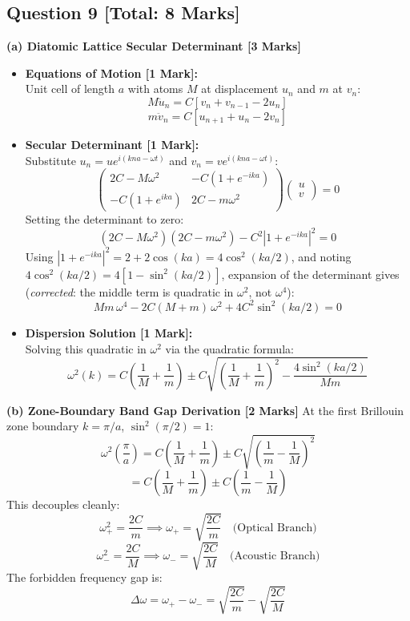 \documentclass[10pt,a4paper,twocolumn]{article}
\begin{document}
\subsection*{Question 9 [Total: 8 Marks]}
\textbf{(a) Diatomic Lattice Secular Determinant [3 Marks]}
\begin{itemize}
    \item \textbf{Equations of Motion [1 Mark]:}\\
    Unit cell of length $a$ with atoms $M$ at displacement $u_n$ and $m$ at $v_n$:
    $$M \ddot{u}_n = C [v_n + v_{n-1} - 2u_n]$$
    $$m \ddot{v}_n = C [u_{n+1} + u_n - 2v_n]$$
    \item \textbf{Secular Determinant [1 Mark]:}\\
    Substitute $u_n = u e^{i(kna - \omega t)}$ and $v_n = v e^{i(kna - \omega t)}$:
    $$\begin{pmatrix} 2C - M\omega^2 & -C(1 + e^{-ika}) \\ -C(1 + e^{ika}) & 2C - m\omega^2 \end{pmatrix} \begin{pmatrix} u \\ v \end{pmatrix} = 0$$
    Setting the determinant to zero:
    $$(2C - M\omega^2)(2C - m\omega^2) - C^2|1 + e^{-ika}|^2 = 0$$
    Using $|1 + e^{-ika}|^2 = 2 + 2\cos(ka) = 4\cos^2(ka/2)$, and noting $4\cos^2(ka/2) = 4[1-\sin^2(ka/2)]$, expansion of the determinant gives (\emph{corrected}: the middle term is quadratic in $\omega^2$, not $\omega^4$):
    $$Mm\,\omega^4 - 2C(M+m)\,\omega^2 + 4C^2\sin^2(ka/2) = 0$$
    \item \textbf{Dispersion Solution [1 Mark]:}\\
    Solving this quadratic in $\omega^2$ via the quadratic formula:
    $$\omega^2(k) = C\left(\frac{1}{M} + \frac{1}{m}\right) \pm C\sqrt{\left(\frac{1}{M} + \frac{1}{m}\right)^2 - \frac{4\sin^2(ka/2)}{Mm}}$$
\end{itemize}

\textbf{(b) Zone-Boundary Band Gap Derivation [2 Marks]}
At the first Brillouin zone boundary $k = \pi/a$, $\sin^2(\pi/2) = 1$:
$$\omega^2\left(\frac{\pi}{a}\right) = C\left(\frac{1}{M} + \frac{1}{m}\right) \pm C\sqrt{\left(\frac{1}{m} - \frac{1}{M}\right)^2}$$
$$= C\left(\frac{1}{M} + \frac{1}{m}\right) \pm C\left(\frac{1}{m} - \frac{1}{M}\right)$$
This decouples cleanly:
$$\omega_+^2 = \frac{2C}{m} \implies \omega_+ = \sqrt{\frac{2C}{m}} \quad \text{(Optical Branch)}$$
$$\omega_-^2 = \frac{2C}{M} \implies \omega_- = \sqrt{\frac{2C}{M}} \quad \text{(Acoustic Branch)}$$
The forbidden frequency gap is:
$$\Delta\omega = \omega_+ - \omega_- = \sqrt{\frac{2C}{m}} - \sqrt{\frac{2C}{M}}$$
\end{document}
